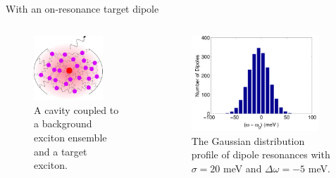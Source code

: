 \documentclass{beamer}
\begin{document}
\begin{frame}{With an on-resonance target dipole}
\begin{columns}
\begin{figure}[htp]%
\centering
\begin{center}
\includegraphics[width=0.8\textwidth]{./Figs/Cavity_withTargetDipole}
\end{center}
\caption[off-resonance case with a target dipole.]{\fontsize{8}{-0.2}\selectfont A cavity coupled to a background exciton ensemble and a target exciton.}
\end{figure}

\begin{figure}[htp]%
\centering
\begin{center}
\includegraphics[width=0.9\textwidth]{./Figs/wddistr_wdrand5s20_qd2000_stat200}
\end{center}
\caption[Background exciton distribution.]{\fontsize{8}{-0.2}\selectfont The Gaussian distribution profile of dipole resonances with $\sigma=20$ meV and $\Delta\omega=-5$ meV.}
\label{offresonance_distr2}
\end{figure}
\end{columns}
\end{frame}
\end{document}
